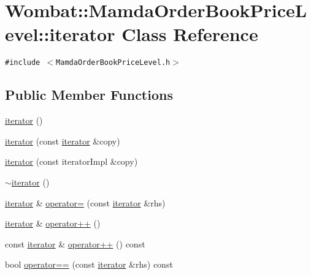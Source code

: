\hypertarget{classWombat_1_1MamdaOrderBookPriceLevel_1_1iterator}{
\section{Wombat::Mamda\-Order\-Book\-Price\-Level::iterator Class Reference}
\label{classWombat_1_1MamdaOrderBookPriceLevel_1_1iterator}
}
{\tt \#include $<$Mamda\-Order\-Book\-Price\-Level.h$>$}

\subsection*{Public Member Functions}
\begin{CompactItemize}
\item 
\hyperlink{classWombat_1_1MamdaOrderBookPriceLevel_1_1iterator_29fc3f50791072bcc18c701dfb928648}{iterator} ()
\item 
\hyperlink{classWombat_1_1MamdaOrderBookPriceLevel_1_1iterator_81fc7bd14de36e8d71bf69c829dc4d72}{iterator} (const \hyperlink{classWombat_1_1MamdaOrderBookPriceLevel_1_1iterator}{iterator} \&copy)
\item 
\hyperlink{classWombat_1_1MamdaOrderBookPriceLevel_1_1iterator_4c198d30d6ce857604f3151505f5ce9f}{iterator} (const iterator\-Impl \&copy)
\item 
\hyperlink{classWombat_1_1MamdaOrderBookPriceLevel_1_1iterator_4570c58f7de151162e6023d868cc8f09}{$\sim$iterator} ()
\item 
\hyperlink{classWombat_1_1MamdaOrderBookPriceLevel_1_1iterator}{iterator} \& \hyperlink{classWombat_1_1MamdaOrderBookPriceLevel_1_1iterator_01e1214e92aa3b3a43ef784abdbb20c9}{operator=} (const \hyperlink{classWombat_1_1MamdaOrderBookPriceLevel_1_1iterator}{iterator} \&rhs)
\item 
\hyperlink{classWombat_1_1MamdaOrderBookPriceLevel_1_1iterator}{iterator} \& \hyperlink{classWombat_1_1MamdaOrderBookPriceLevel_1_1iterator_61c69420035a68e0d7af3339a1812a68}{operator++} ()
\item 
const \hyperlink{classWombat_1_1MamdaOrderBookPriceLevel_1_1iterator}{iterator} \& \hyperlink{classWombat_1_1MamdaOrderBookPriceLevel_1_1iterator_7a1c25527e0ff2382a538267a21f819a}{operator++} () const 
\item 
bool \hyperlink{classWombat_1_1MamdaOrderBookPriceLevel_1_1iterator_cdc9701f6cebfc4fde6b6459d1248346}{operator==} (const \hyperlink{classWombat_1_1MamdaOrderBookPriceLevel_1_1iterator}{iterator} \&rhs) const 

\end{CompactItemize}
